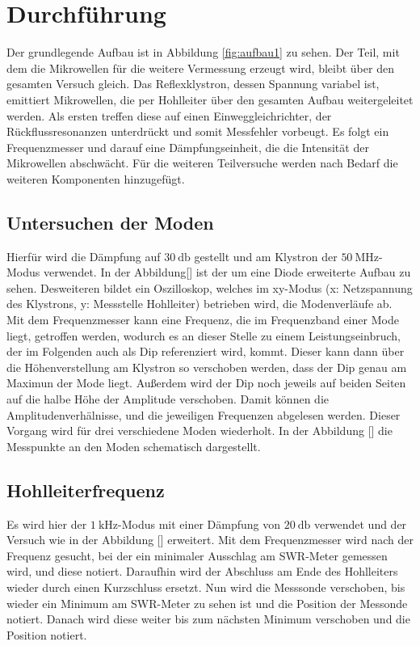 \section{Durchführung}
\label{sec:Durchführung}

Der grundlegende Aufbau ist in Abbildung \ref{fig:aufbau1} zu sehen. Der Teil, mit dem die Mikrowellen für die weitere Vermessung erzeugt wird, bleibt über den 
gesamten Versuch gleich. Das Reflexklystron, dessen Spannung variabel ist, emittiert Mikrowellen, die per Hohlleiter über den gesamten Aufbau weitergeleitet werden. Als 
ersten treffen diese auf einen Einweggleichrichter, der Rückflussresonanzen unterdrückt und somit Messfehler vorbeugt. Es folgt ein Frequenzmesser und darauf eine Dämpfungseinheit,
die die Intensität der Mikrowellen abschwächt. Für die weiteren Teilversuche werden nach Bedarf die weiteren Komponenten hinzugefügt.

\subsection{Untersuchen der Moden}

Hierfür wird die Dämpfung auf $\SI{30}{\decibel} $ gestellt und am Klystron der $\SI{50}{\mega\hertz} $-Modus verwendet.
In der Abbildung[] ist der um eine Diode erweiterte Aufbau zu sehen. Desweiteren bildet ein Oszilloskop, welches im xy-Modus (x: Netzspannung des Klystrons, y: Messstelle Hohlleiter) 
betrieben wird, die Modenverläufe ab. Mit dem Frequenzmesser kann eine Frequenz, die im Frequenzband einer Mode liegt, getroffen werden, wodurch es an dieser Stelle zu einem 
Leistungseinbruch, der im Folgenden auch als Dip referenziert wird, kommt. Dieser kann dann über die Höhenverstellung am Klystron so verschoben werden, dass der Dip genau am 
Maximun der Mode liegt. Außerdem wird der Dip noch jeweils auf beiden Seiten auf die halbe Höhe der Amplitude verschoben. Damit können die Amplitudenverhälnisse, und die jeweiligen 
Frequenzen abgelesen werden. Dieser Vorgang wird für drei verschiedene Moden wiederholt. In der Abbildung [] die Messpunkte an den Moden schematisch dargestellt. 

\subsection{Hohlleiterfrequenz}

Es wird hier der $\SI{1}{\kilo\hertz} $-Modus mit einer Dämpfung von $\SI{20}{\decibel} $ verwendet und der Versuch wie in der Abbildung [] erweitert. Mit dem Frequenzmesser wird 
nach der Frequenz gesucht, bei der ein minimaler Ausschlag am SWR-Meter gemessen wird, und diese notiert. Daraufhin wird der Abschluss am Ende des Hohlleiters wieder durch einen 
Kurzschluss ersetzt. Nun wird die Messsonde verschoben, bis wieder ein Minimum am SWR-Meter zu sehen ist und die Position der Messonde notiert. Danach wird diese weiter bis zum 
nächsten Minimum verschoben und die Position notiert. 

